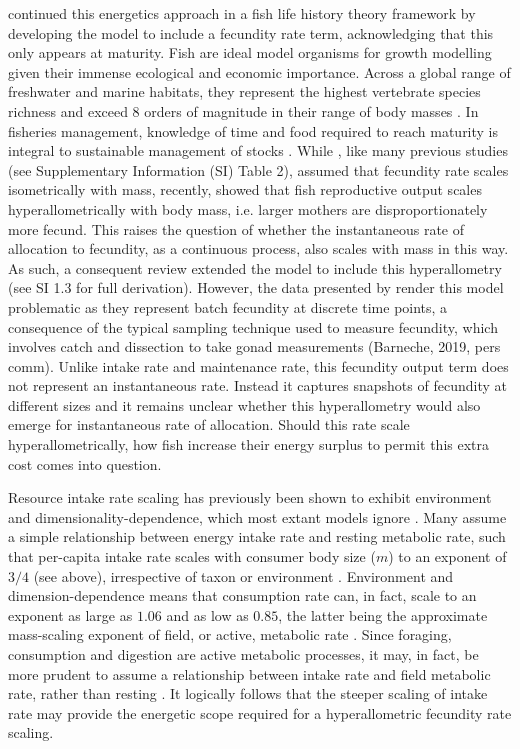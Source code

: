 \documentclass[a4paper]{article} %
\begin{document}
    \textcite{Charnov2001} continued this energetics approach in a fish life history theory framework by developing the \textcite{West2001} model to include a fecundity rate term, acknowledging that this only appears at maturity. Fish are ideal model organisms for growth modelling given their immense ecological and economic importance. Across a global range of freshwater and marine habitats, they represent the highest vertebrate species richness and exceed 8 orders of magnitude in their range of body masses \autocite{Barneche2018c}. In fisheries management, knowledge of time and food required to reach maturity is integral to sustainable management of stocks \autocite{Szuwalski2017, Barneche2018c}.
    While \textcite{Charnov2001}, like many previous studies (see Supplementary Information (SI) Table 2), assumed that fecundity rate scales isometrically with mass, recently, \textcite{Barneche2018-reproductive_output} showed that fish reproductive output scales hyperallometrically with body mass, i.e. larger mothers are disproportionately more fecund. This raises the question of whether the instantaneous rate of allocation to fecundity, as a continuous process, also scales with mass in this way. As such, a consequent review extended the \textcite{Charnov2001} model to include this hyperallometry \autocite{Marshall2019b} (see SI 1.3 for full derivation). However, the data presented by \textcite{Barneche2018-reproductive_output} render this model problematic as they represent batch fecundity at discrete time points, a consequence of the typical sampling technique used to measure fecundity, which involves catch and dissection to take gonad measurements (Barneche, 2019, pers comm). Unlike intake rate and maintenance rate, this fecundity output term does not represent an instantaneous rate. Instead it captures snapshots of fecundity at different sizes and it remains unclear whether this hyperallometry would also emerge for instantaneous rate of allocation. Should this rate scale hyperallometrically, how fish increase their energy surplus to permit this extra cost comes into question.

    Resource intake rate scaling has previously been shown to exhibit environment and dimensionality-dependence, which most extant models ignore \autocite{Pawar2012}. Many assume a simple relationship between energy intake rate and resting metabolic rate, such that per-capita intake rate scales with consumer body size ($m$) to an exponent of $3/4$ (see above), irrespective of taxon or environment \autocite{Pawar2012}. Environment and dimension-dependence means that consumption rate can, in fact, scale to an exponent as large as $1.06$ and as low as $0.85$, the latter being the approximate mass-scaling exponent of field, or active, metabolic rate \autocite{peters1983,Weibel2004, Pawar2012}. Since foraging, consumption and digestion are active metabolic processes, it may, in fact, be more prudent to assume a relationship between intake rate and field metabolic rate, rather than resting \autocite{Boisclair1993}. It logically follows that the steeper scaling of intake rate may provide the energetic scope required for a hyperallometric fecundity rate scaling.
\end{document}
